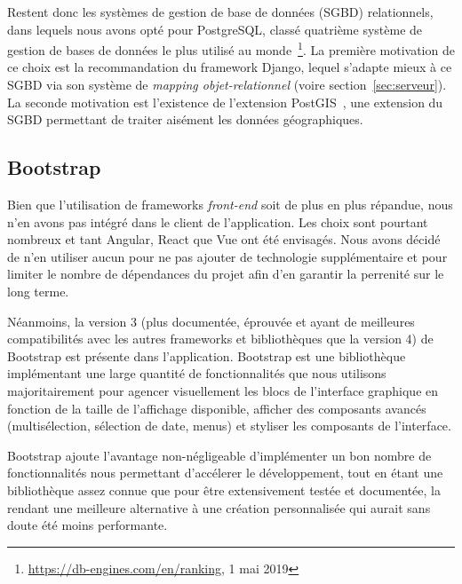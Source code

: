 \documentclass{EPL-master-thesis-covers-FR}
\begin{document}
				Restent donc les systèmes de gestion de base de données (SGBD) relationnels, dans lequels nous avons opté pour PostgreSQL, classé quatrième système de gestion de bases de données le plus utilisé au monde~\footnote{\url{https://db-engines.com/en/ranking}, 1 mai 2019}. La première motivation de ce choix est la recommandation du framework Django, lequel s'adapte mieux à ce SGBD via son système de \emph{mapping objet-relationnel} (voire section~\ref{sec:serveur}). La seconde motivation est l'existence de l'extension PostGIS~\cite{ref:postgis}, une extension du SGBD permettant de traiter aisément les données géographiques.

			\subsection*{Bootstrap}

				Bien que l'utilisation de frameworks \emph{front-end} soit de plus en plus répandue, nous n'en avons pas intégré dans le client de l'application. Les choix sont pourtant nombreux et tant Angular, React que Vue ont été envisagés. Nous avons décidé de n'en utiliser aucun pour ne pas ajouter de technologie supplémentaire et pour limiter le nombre de dépendances du projet afin d'en garantir la perrenité sur le long terme.

				Néanmoins, la version 3 (plus documentée, éprouvée et ayant de meilleures compatibilités avec les autres frameworks et bibliothèques que la version 4) de Bootstrap est présente dans l'application. Bootstrap est une bibliothèque implémentant une large quantité de fonctionnalités que nous utilisons majoritairement pour agencer visuellement les blocs de l'interface graphique en fonction de la taille de l'affichage disponible, afficher des composants avancés (multisélection, sélection de date, menus) et styliser les composants de l'interface.

				Bootstrap ajoute l'avantage non-négligeable d'implémenter un bon nombre de fonctionnalités nous permettant d'accélerer le développement, tout en étant une bibliothèque assez connue que pour être extensivement testée et documentée, la rendant une meilleure alternative à une création personnalisée qui aurait sans doute été moins performante.
\end{document}
